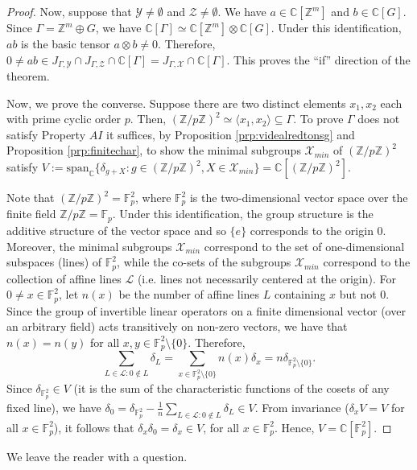 \documentclass[a4paper, 12pt]{amsart}
\theoremstyle{definition}
\theoremstyle{remark}
\numberwithin{equation}{section}
\begin{document}
\begin{proof}
    Now, suppose that $\mathcal{Y}\neq\emptyset$ and $\mathcal{Z}\neq\emptyset$. We have $a\in \mathbb{C}[\mathbb{Z}^{m}]$ and $b\in \mathbb{C}[G]$. Since $\Gamma = \mathbb{Z}^{m}\oplus G$, we have $\mathbb{C}[\Gamma]\simeq \mathbb{C}[\mathbb{Z}^{m}]\otimes \mathbb{C}[G]$. Under this identification, $ab$ is the basic tensor $a\otimes b\neq 0$. Therefore, $0\neq ab\in J_{\Gamma, \mathcal{Y}}\cap J_{\Gamma, \mathcal{Z}}\cap\mathbb{C}[\Gamma] = J_{\Gamma, \mathcal{X}}\cap\mathbb{C}[\Gamma]$. This proves the ``if'' direction of the theorem.

    Now, we prove the converse. Suppose there are two distinct elements $x_{1},x_{2}$ each with prime cyclic order $p$. Then, $(\mathbb{Z}/p\mathbb{Z})^{2}\simeq \langle x_{1},x_{2}\rangle \subseteq \Gamma$. To prove $\Gamma$ does not satisfy Property $AI$ it suffices, by Proposition \ref{prp:videalredtonsg} and Proposition \ref{prp:finitechar}, to show the minimal subgroups $\mathcal{X}_{min}$ of $(\mathbb{Z}/p\mathbb{Z})^{2}$ satisfy $V:=  \text{span}_{\mathbb{C}}\{\delta_{g + X}: g\in (\mathbb{Z}/p\mathbb{Z})^{2}, X\in\mathcal{X}_{min}\} =  \mathbb{C}[(\mathbb{Z}/p\mathbb{Z})^{2}]$.

    Note that $(\mathbb{Z}/p\mathbb{Z})^{2} = \mathbb{F}^{2}_{p}$, where $\mathbb{F}^{2}_{p}$ is the two-dimensional vector space over the finite field $\mathbb{Z}/p\mathbb{Z} = \mathbb{F}_{p}$. Under this identification, the group structure is the additive structure of the vector space and so $\{e\}$ corresponds to the origin $0$. Moreover, the minimal subgroups $\mathcal{X}_{min}$ correspond to the set of one-dimensional subspaces (lines) of $\mathbb{F}^{2}_{p}$, while the co-sets of the subgroups $\mathcal{X}_{min}$ correspond to the collection of affine lines $\mathcal{L}$ (i.e. lines not necessarily centered at the origin). For $0\neq x\in \mathbb{F}^{2}_{p}$, let $n(x)$ be the number of affine lines $L$ containing $x$ but not $0$. Since the group of invertible linear operators on a finite dimensional vector (over an arbitrary field) acts transitively on non-zero vectors, we have that $n(x) = n(y)$ for all $x,y\in \mathbb{F}^{2}_{p}\setminus \{0\}$. Therefore,
    $$\sum_{L\in \mathcal{L}:0\notin L}\delta_{L} = \sum_{x\in \mathbb{F}^{2}_{p}\setminus \{0\}}n(x)\delta_{x} = n\delta_{\mathbb{F}^{2}_{p}\setminus \{0\}}.$$
    Since $\delta_{\mathbb{F}^{2}_{p}}\in V$ (it is the sum of the characteristic functions of the cosets of any fixed line), we have $\delta_{0} = \delta_{\mathbb{F}^{2}_{p}} - \frac{1}{n}\sum_{L\in \mathcal{L}:0\notin L}\delta_{L}\in V$. From invariance ($\delta_{x}V = V$ for all $x\in \mathbb{F}^{2}_{p}$), it follows that $\delta_{x}\delta_{0} = \delta_{x}\in V$, for all $x\in\mathbb{F}^{2}_{p}$. Hence, $V = \mathbb{C}[\mathbb{F}^{2}_{p}]$.
\end{proof}
We leave the reader with a question.
\end{document}
